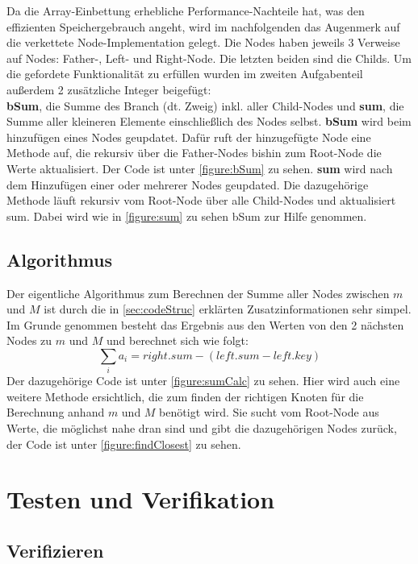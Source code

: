 \documentclass[11pt]{scrartcl}
\begin{document}
		Da die Array-Einbettung erhebliche Performance-Nachteile hat, was den effizienten Speichergebrauch angeht, wird im nachfolgenden das Augenmerk auf die verkettete Node-Implementation gelegt.
		Die Nodes haben jeweils 3 Verweise auf Nodes: Father-, Left- und Right-Node. Die letzten beiden sind die Childs. 
		Um die gefordete Funktionalität zu erfüllen wurden im zweiten Aufgabenteil außerdem 2 zusätzliche Integer beigefügt: \\
		\textbf{bSum}, die Summe des Branch (dt. Zweig) inkl. aller Child-Nodes und \textbf{sum}, die Summe aller kleineren Elemente einschließlich des Nodes selbst.
		\textbf{bSum} wird beim hinzufügen eines Nodes geupdatet. Dafür ruft der hinzugefügte Node eine Methode auf, die rekursiv über die Father-Nodes bishin zum Root-Node die Werte aktualisiert. Der Code ist unter \ref{figure:bSum} zu sehen.
		\textbf{sum} wird nach dem Hinzufügen einer oder mehrerer Nodes geupdated. Die dazugehörige Methode läuft rekursiv vom Root-Node über alle Child-Nodes und aktualisiert sum. Dabei wird wie in \ref{figure:sum} zu sehen bSum zur Hilfe genommen.

	\subsection{Algorithmus}
		\label{sec:algo}

		Der eigentliche Algorithmus zum Berechnen der Summe aller Nodes zwischen $m$ und $M$ ist durch die in \ref{sec:codeStruc} erklärten Zusatzinformationen sehr simpel.
		Im Grunde genommen besteht das Ergebnis aus den Werten von den 2 nächsten Nodes zu $m$ und $M$ und berechnet sich wie folgt:
		\begin{equation*}
		\sum_{i}a_i = right.sum - (left.sum - left.key)
		\end{equation*}
		Der dazugehörige Code ist unter \ref{figure:sumCalc} zu sehen. Hier wird auch eine weitere Methode ersichtlich, die zum finden der richtigen Knoten für die Berechnung anhand $m$ und $M$ benötigt wird.
		Sie sucht vom Root-Node aus Werte, die möglichst nahe dran sind und gibt die dazugehörigen Nodes zurück, der Code ist unter \ref{figure:findClosest} zu sehen.

		
\section{Testen und Verifikation}
\label{sec:vertests}

	\subsection{Verifizieren}
		\label{sec:veri}
		
\end{document}

